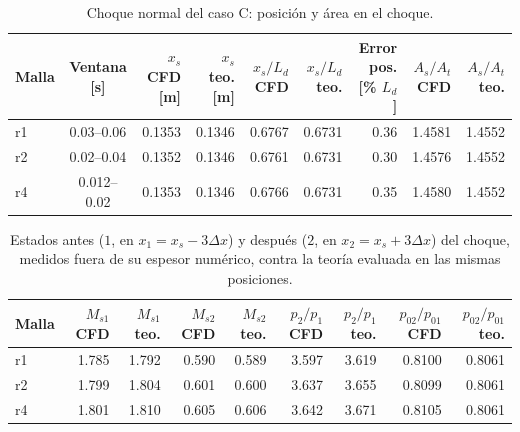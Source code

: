 \begin{table}[H]
\centering
\caption{Choque normal del caso C: posición y área en el choque.}
\label{tab:choque-C}
\footnotesize\setlength{\tabcolsep}{3pt}
\begin{tabular}{lcrrrrrrr}
\toprule
Malla & Ventana [s] & $x_s$ CFD [m] & $x_s$ teo. [m] & $x_s/L_d$ CFD & $x_s/L_d$ teo. & Error pos. [\% $L_d$] & $A_s/A_t$ CFD & $A_s/A_t$ teo. \\
\midrule
r1 & 0.03--0.06 & 0.1353 & 0.1346 & 0.6767 & 0.6731 & 0.36 & 1.4581 & 1.4552 \\
r2 & 0.02--0.04 & 0.1352 & 0.1346 & 0.6761 & 0.6731 & 0.30 & 1.4576 & 1.4552 \\
r4 & 0.012--0.02 & 0.1353 & 0.1346 & 0.6766 & 0.6731 & 0.35 & 1.4580 & 1.4552 \\
\bottomrule
\end{tabular}
\end{table}

\begin{table}[H]
\centering
\caption{Estados antes ($1$, en $x_1=x_s-3\Delta x$) y después ($2$, en $x_2=x_s+3\Delta x$) del choque, medidos fuera de su espesor numérico, contra la teoría evaluada en las mismas posiciones.}
\label{tab:choque-C-estados}
\footnotesize\setlength{\tabcolsep}{3pt}
\begin{tabular}{lrrrrrrrr}
\toprule
Malla & $M_{s1}$ CFD & $M_{s1}$ teo. & $M_{s2}$ CFD & $M_{s2}$ teo. & $p_2/p_1$ CFD & $p_2/p_1$ teo. & $p_{02}/p_{01}$ CFD & $p_{02}/p_{01}$ teo. \\
\midrule
r1 & 1.785 & 1.792 & 0.590 & 0.589 & 3.597 & 3.619 & 0.8100 & 0.8061 \\
r2 & 1.799 & 1.804 & 0.601 & 0.600 & 3.637 & 3.655 & 0.8099 & 0.8061 \\
r4 & 1.801 & 1.810 & 0.605 & 0.606 & 3.642 & 3.671 & 0.8105 & 0.8061 \\
\bottomrule
\end{tabular}
\end{table}
